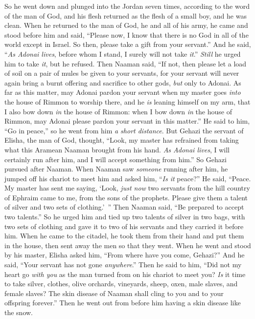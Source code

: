 \begin{biblechapter}
\verse So he went down and plunged into the Jordan seven times, according to the word of the man of God, and his flesh returned as the flesh of a small boy, and he was clean.
 When he returned to the man of God, he and all of his army, he came and stood before him and said, “Please now, I know that there is no God in all of the world except in Israel. So then, please take a gift from your servant.”
\verse And he said, “\textit{As Adonai lives}, before whom I stand, I surely will not take \textit{it}.” \textit{Still} he urged him to take \textit{it}, but he refused.
\verse Then Naaman said, “If not, then please let a load of soil on a pair of mules be given to your servants, for your servant will never again bring a burnt offering and sacrifice to other gods, \textit{but} only to Adonai.
\verse As far as this matter, may Adonai pardon your servant when my master goes \textit{into} the house of Rimmon to worship there, and he \textit{is} leaning himself on my arm, that I also bow down \textit{in} the house of Rimmon: when I bow down \textit{in} the house of Rimmon, may Adonai please pardon your servant in this matter.”
\verse He said to him, “Go in peace,” so he went from him \textit{a short distance}.
\verse But Gehazi the servant of Elisha, the man of God, thought, “Look, my master has refrained from taking what this Aramean Naaman brought from his hand. \textit{As Adonai lives}, I will certainly run after him, and I will accept something from him.”
\verse So Gehazi pursued after Naaman. When Naaman saw \textit{someone} running after him, he jumped off his chariot to meet him and asked him, “\textit{Is it} peace?”
\verse He said, “Peace. My master has sent me saying, ‘Look, \textit{just now} two servants from the hill country of Ephraim came to me, from the sons of the prophets. Please give them a talent of silver and two sets of clothing.’ ”
\verse Then Naaman said, “Be prepared to accept two talents.” So he urged him and tied up two talents of silver in two bags, with two sets of clothing and gave it to two of his servants and they carried it before him.
\verse When he came to the citadel, he took them from their hand and put them in the house, then sent away the men so that they went.
\verse When he went and stood by his master, Elisha asked him, “From where have you come, Gehazi?” And he said, “Your servant has not gone \textit{anywhere}.”
\verse Then he said to him, “Did not my heart go \textit{with you} as the man turned from on his chariot to meet you? \textit{Is} it time to take silver, clothes, olive orchards, vineyards, sheep, oxen, male slaves, and female slaves?
\verse The skin disease of Naaman shall cling to you and to your offspring forever.” Then he went out from before him having a skin disease like the snow.
\end{biblechapter}

